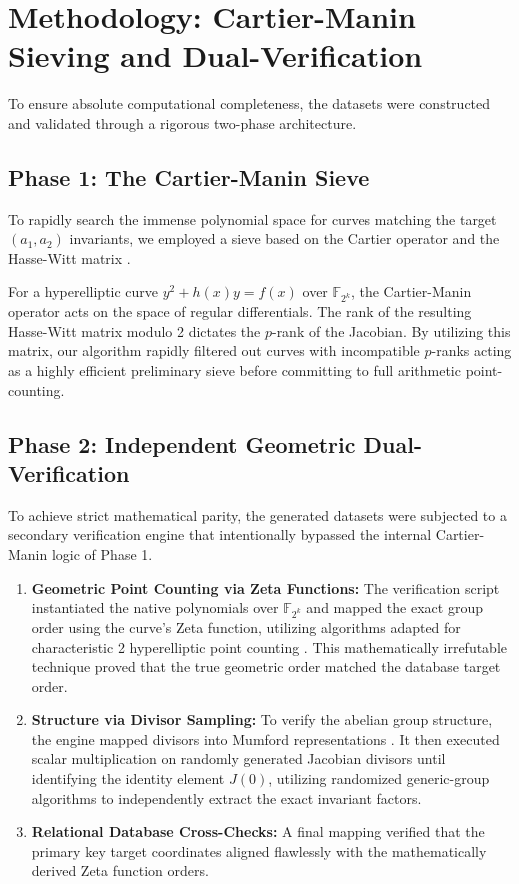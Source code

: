\documentclass[12pt]{article}
\begin{document}
\section{Methodology: Cartier-Manin Sieving and Dual-Verification}
To ensure absolute computational completeness, the datasets were constructed and validated through a rigorous two-phase architecture. 

\subsection{Phase 1: The Cartier-Manin Sieve}
To rapidly search the immense polynomial space for curves matching the target $(a_1, a_2)$ invariants, we employed a sieve based on the Cartier operator \cite{Cartier1958} and the Hasse-Witt matrix \cite{Manin1963}. 

For a hyperelliptic curve $y^2 + h(x)y = f(x)$ over $\mathbb{F}_{2^k}$, the Cartier-Manin operator acts on the space of regular differentials. The rank of the resulting Hasse-Witt matrix modulo 2 dictates the $p$-rank of the Jacobian. By utilizing this matrix, our algorithm rapidly filtered out curves with incompatible $p$-ranks acting as a highly efficient preliminary sieve before committing to full arithmetic point-counting.

\subsection{Phase 2: Independent Geometric Dual-Verification}
To achieve strict mathematical parity, the generated datasets were subjected to a secondary verification engine that intentionally bypassed the internal Cartier-Manin logic of Phase 1.

\begin{enumerate}
    \item \textbf{Geometric Point Counting via Zeta Functions:} The verification script instantiated the native polynomials over $\mathbb{F}_{2^k}$ and mapped the exact group order using the curve's Zeta function, utilizing algorithms adapted for characteristic 2 hyperelliptic point counting \cite{Denef2006}. This mathematically irrefutable technique proved that the true geometric order matched the database target order.
    \item \textbf{Structure via Divisor Sampling:} To verify the abelian group structure, the engine mapped divisors into Mumford representations \cite{Cantor1987}. It then executed scalar multiplication on randomly generated Jacobian divisors until identifying the identity element $J(0)$, utilizing randomized generic-group algorithms \cite{Sutherland2007} to independently extract the exact invariant factors.
    \item \textbf{Relational Database Cross-Checks:} A final mapping verified that the primary key target coordinates aligned flawlessly with the mathematically derived Zeta function orders.
\end{enumerate}
\end{document}
